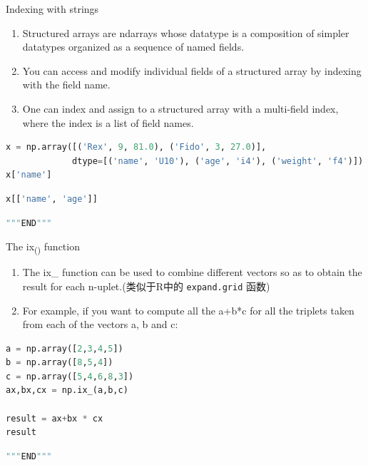 \documentclass[ignorenonframetext,11pt,xcolor=dvipsnames,hyperref={colorlinks,allcolors=.,urlcolor=blue, citecolor=violet, bookmarksdepth=4},aspectratio=1610]{beamer}
\providecommand{\tightlist}{%
  \setlength{\itemsep}{0pt}\setlength{\parskip}{0pt}}
\newcommand{\passthrough}[1]{#1}
\begin{document}
\begin{frame}[fragile]{Indexing with strings}
\protect\hypertarget{indexing-with-strings}{}

\begin{enumerate}
\tightlist
\item
  Structured arrays are ndarrays whose datatype is a composition of
  simpler datatypes organized as a sequence of named fields.
\item
  You can access and modify individual fields of a structured array by
  indexing with the field name.
\item
  One can index and assign to a structured array with a multi-field
  index, where the index is a list of field names.
\end{enumerate}

\begin{lstlisting}[language=Python]
x = np.array([('Rex', 9, 81.0), ('Fido', 3, 27.0)],
             dtype=[('name', 'U10'), ('age', 'i4'), ('weight', 'f4')])
x['name']
\end{lstlisting}

\begin{lstlisting}[language=Python]
x[['name', 'age']]
\end{lstlisting}

\begin{lstlisting}[language=Python]
"""END"""
\end{lstlisting}

\end{frame}

\begin{frame}[fragile]{The ix\textsubscript{()} function}
\protect\hypertarget{the-ix-function}{}

\begin{enumerate}
\tightlist
\item
  The ix\_ function can be used to combine different vectors so as to
  obtain the result for each n-uplet.(类似于R中的
  \passthrough{\lstinline!expand.grid!} 函数)
\item
  For example, if you want to compute all the a+b*c for all the triplets
  taken from each of the vectors a, b and c:
\end{enumerate}

\begin{lstlisting}[language=Python]
a = np.array([2,3,4,5])
b = np.array([8,5,4])
c = np.array([5,4,6,8,3])
ax,bx,cx = np.ix_(a,b,c)

result = ax+bx * cx
result
\end{lstlisting}

\begin{lstlisting}[language=Python]
"""END"""
\end{lstlisting}

\end{frame}
\end{document}
